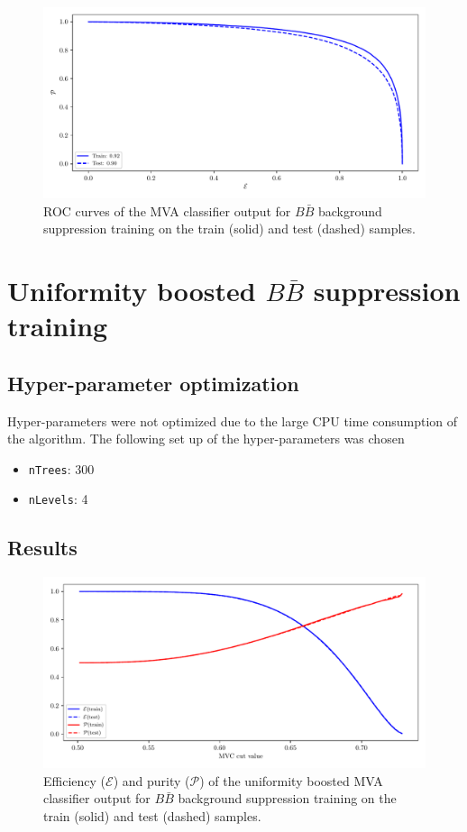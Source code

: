\begin{figure}[H]
\centering
\captionsetup{width=0.8\linewidth}
\includegraphics[width=\linewidth]{fig/addendums/BBcC_roc}
\caption{ROC curves of the MVA classifier output for $B\bar B$ background suppression training on the train (solid) and test (dashed) samples.}
\end{figure}

\section*{Uniformity boosted $B \bar B$ suppression training}

\subsection*{Hyper-parameter optimization}

Hyper-parameters were not optimized due to the large CPU time consumption of the algorithm. The following set up of the hyper-parameters was chosen
\begin{itemize}
\item \texttt{nTrees}: 300
\item \texttt{nLevels}: 4
\end{itemize}

\subsection*{Results}

\begin{figure}[H]
\centering
\captionsetup{width=0.8\linewidth}
\includegraphics[width=\linewidth]{fig/addendums/uBBcC_effpur}
\caption{Efficiency ($\mathcal{E}$) and purity ($\mathcal{P}$) of the uniformity boosted MVA classifier output for $B\bar B$ background suppression training on the train (solid) and test (dashed) samples.}
\end{figure}

